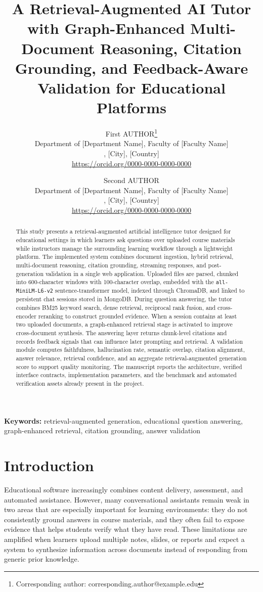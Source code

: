 \documentclass[11pt,a4paper]{article}
\title{A Retrieval-Augmented AI Tutor with Graph-Enhanced Multi-Document Reasoning, Citation Grounding, and Feedback-Aware Validation for Educational Platforms}
\author{
First AUTHOR\thanks{Corresponding author: corresponding.author@example.edu}\\
Department of [Department Name], Faculty of [Faculty Name]\\
[University Name], [City], [Country]\\
\url{https://orcid.org/0000-0000-0000-0000}
\and
Second AUTHOR\\
Department of [Department Name], Faculty of [Faculty Name]\\
[University Name], [City], [Country]\\
\url{https://orcid.org/0000-0000-0000-0000}
}
\date{}
\begin{document}
\maketitle

\begin{abstract}
This study presents a retrieval-augmented artificial intelligence tutor designed for educational settings in which learners ask questions over uploaded course materials while instructors manage the surrounding learning workflow through a lightweight platform. The implemented system combines document ingestion, hybrid retrieval, multi-document reasoning, citation grounding, streaming responses, and post-generation validation in a single web application. Uploaded files are parsed, chunked into 600-character windows with 100-character overlap, embedded with the \texttt{all-MiniLM-L6-v2} sentence-transformer model, indexed through ChromaDB, and linked to persistent chat sessions stored in MongoDB. During question answering, the tutor combines BM25 keyword search, dense retrieval, reciprocal rank fusion, and cross-encoder reranking to construct grounded evidence. When a session contains at least two uploaded documents, a graph-enhanced retrieval stage is activated to improve cross-document synthesis. The answering layer returns chunk-level citations and records feedback signals that can influence later prompting and retrieval. A validation module computes faithfulness, hallucination rate, semantic overlap, citation alignment, answer relevance, retrieval confidence, and an aggregate retrieval-augmented generation score to support quality monitoring. The manuscript reports the architecture, verified interface contracts, implementation parameters, and the benchmark and automated verification assets already present in the project.
\end{abstract}

\noindent\textbf{Keywords:} retrieval-augmented generation, educational question answering, graph-enhanced retrieval, citation grounding, answer validation

\section{Introduction}

Educational software increasingly combines content delivery, assessment, and automated assistance. However, many conversational assistants remain weak in two areas that are especially important for learning environments: they do not consistently ground answers in course materials, and they often fail to expose evidence that helps students verify what they have read. These limitations are amplified when learners upload multiple notes, slides, or reports and expect a system to synthesize information across documents instead of responding from generic prior knowledge.
\end{document}
